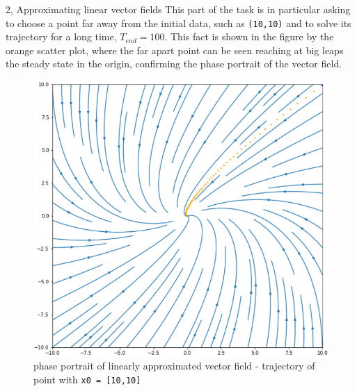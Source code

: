 \documentclass[10pt,a4paper]{article}
\begin{document}
\begin{task}{2, Approximating linear vector fields}
This part of the task is in particular asking to choose a point far away from the initial data, such as \texttt{(10,10)} and to solve its trajectory  for a long time, $T_{end} = 100$. This fact is shown in the figure by the orange scatter plot, where the far apart point can be seen reaching at big leaps the steady state in the origin, confirming the phase portrait of the vector field.
\begin{figure}[H]
    \centering
    \includegraphics[scale=0.5]{images/task2_part3.png}
    \caption{phase portrait of linearly approximated vector field - trajectory of point with \texttt{x0 = [10,10]}}
    \label{fig:task2-portrait}
\end{figure}
\end{task}
\end{document}
